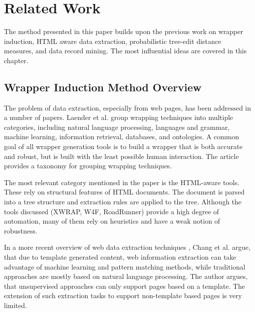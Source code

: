 \chapter{Related Work}
\label{ch:related-work}




The method presented in this paper builds upon the previous work on wrapper induction, HTML aware data extraction, probabilistic tree-edit distance measures, and data record mining. The most influential ideas are covered in this chapter.


\section{Wrapper Induction Method Overview}
\label{sec:wrapper-induction}

The problem of data extraction, especially from web pages, has been addressed in a number of papers. Laender et al. \cite{Laender:2002:BSW:565117.565137} group wrapping techniques into multiple categories, including natural language processing, languages and grammar, machine learning, information retrieval, databases, and ontologies. A common goal of all wrapper generation tools is to build a wrapper that is both accurate and robust, but is built with the least possible human interaction. The article provides a taxonomy for grouping wrapping techniques.

The most relevant category mentioned in the paper is the HTML-aware tools. These rely on structural features of HTML documents. The document is parsed into a tree structure and extraction rules are applied to the tree. Although the tools discussed (XWRAP, W4F, RoadRunner) provide a high degree of automation, many of them rely on heuristics and have a weak notion of robustness.

In a more recent overview of web data extraction techniques \cite{Chang:2006:SWI:1159162.1159300}, Chang et al. argue, that due to template generated content, web information extraction can take advantage of machine learning and pattern matching methods, while traditional approaches are mostly based on natural language processing. The author argues, that unsupervised approaches can only support pages based on a template. The extension of such extraction tasks to support non-template based pages is very limited.

